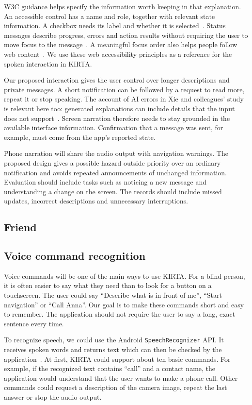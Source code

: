 \documentclass[10pt,twoside,english,a4paper]{article}
\begin{document}
W3C guidance helps specify the information worth keeping in that explanation. An accessible control has a name and role, together with relevant state information. A checkbox needs its label and whether it is selected~\cite{wcagname}. Status messages describe progress, errors and action results without requiring the user to move focus to the message~\cite{wcagstatus}. A meaningful focus order also helps people follow web content~\cite{wcagfocus}. We use these web accessibility principles as a reference for the spoken interaction in KIRTA.

Our proposed interaction gives the user control over longer descriptions and private messages. A short notification can be followed by a request to read more, repeat it or stop speaking. The account of AI errors in Xie and colleagues' study is relevant here too: generated explanations can include details that the input does not support~\cite{xie2025}. Screen narration therefore needs to stay grounded in the available interface information. Confirmation that a message was sent, for example, must come from the app's reported state.

Phone narration will share the audio output with navigation warnings. The proposed design gives a possible hazard outside priority over an ordinary notification and avoids repeated announcements of unchanged information. Evaluation should include tasks such as noticing a new message and understanding a change on the screen. The records should include missed updates, incorrect descriptions and unnecessary interruptions.

\subsection*{Friend}

\subsection*{Voice command recognition}

Voice commands will be one of the main ways to use KIRTA. For a blind person, it is often easier to say what they need than to look for a button on a touchscreen. The user could say ``Describe what is in front of me'', ``Start navigation'' or ``Call Anna''. Our goal is to make these commands short and easy to remember. The application should not require the user to say a long, exact sentence every time.

To recognize speech, we could use the Android \texttt{SpeechRecognizer} API. It receives spoken words and returns text which can then be checked by the application~\cite{androidspeech}. At first, KIRTA could support about ten basic commands. For example, if the recognized text contains ``call'' and a contact name, the application would understand that the user wants to make a phone call. Other commands could request a description of the camera image, repeat the last answer or stop the audio output.
\end{document}
